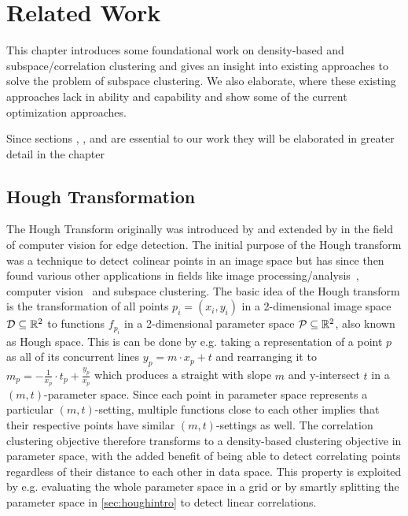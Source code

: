 \chapter{Related Work}
\label{sec:Related Work}
This chapter introduces some foundational work on density-based and subspace/correlation clustering and gives an insight into existing approaches to solve the problem of subspace clustering. We also elaborate, where these existing approaches lack in ability and capability and show some of the current optimization approaches.

Since sections , ,  and  are essential to our work they will be elaborated in greater detail in the chapter 

\section{Hough Transformation}\label{sec:houghintro}
The Hough Transform originally was introduced by \textcite{houghOriginal1962method} and extended by \textcite{rosenfeld1969picture} in the field of computer vision for edge detection\cite{houghhistoryhart2009hough}. The initial purpose of the Hough transform was a technique to detect colinear points in an image space but has since then found various other applications in fields like image processing/analysis~\cite{rosenfeld1969picture,ballard1981generalizing}, computer vision~\cite{davies2004machine} and subspace clustering\cite{CASHachtert2008robust}.
The basic idea of the Hough transform is the transformation of all points $p_i = (x_i,y_i)$ in a 2-dimensional image space $\mathcal{D} \subseteq \mathbb{R}^2$ to functions $f_{p_i}$ in a 2-dimensional parameter space $\mathcal{P} \subseteq \mathbb{R}^2$, also known as Hough space\cite{illingworth1988survey}. This is can be done by e.g. taking a representation of a point $p$ as all of its concurrent lines $y_p = m \cdot x_p + t$ and rearranging it to $m_{p} = - \frac{1}{x_p} \cdot t_{p} + \frac{y_p}{x_p}$ which produces a straight with slope $m$ and y-intersect $t$ in a $(m,t)$-parameter space. Since each point in parameter space represents a particular $(m,t)$-setting, multiple functions close to each other implies that their respective points have similar $(m,t)$-settings as well. The correlation clustering objective therefore transforms to a density-based clustering objective in parameter space, with the added benefit of being able to detect correlating points regardless of their distance to each other in data space. This property is exploited by e.g. evaluating the whole parameter space in a grid or by smartly splitting the parameter space in \autoref{sec:houghintro} to detect linear correlations. 
